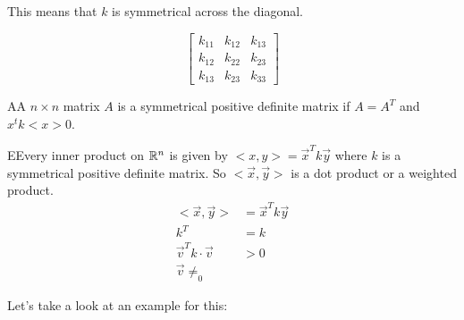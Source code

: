 	This means that $k$ is symmetrical across the diagonal.

	\begin{equation}
		\begin{bmatrix} k_{11}&k_{12}&k_{13}\\ k_{12}&k_{22}&k_{23}\\ k_{13}&k_{23}&k_{33} \end{bmatrix} 
	\end{equation}

	\begin{definition}
		AA $n\times n$ matrix $A$ is a symmetrical positive definite matrix if $A=A^{T}$ and $x^{t}k<x>0$.
	\end{definition}

	\begin{theorem}
		EEvery inner product on $\mathbb{R}^{n}$ is given by $<x,y> = \vec{x}^{T}k\vec{y}$ where $k$ is a symmetrical positive definite matrix. So $<\vec{x},\vec{y}>$ is a dot product or a weighted product.
		\begin{align}
			<\vec{x},\vec{y}> &= \vec{x}^{T}k\vec{y}\\
			k^{T}&=k\\
			\vec{v}^{T}k\cdot\vec{v} &>0\\
			\vec{v}\neq_0
		\end{align}
	\end{theorem}

	Let's take a look at an example for this:

